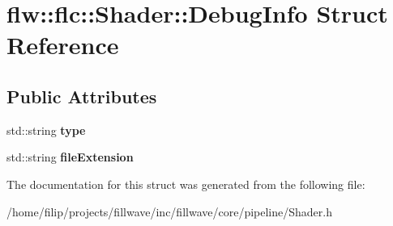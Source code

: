 \hypertarget{structflw_1_1flc_1_1Shader_1_1DebugInfo}{}\section{flw\+:\+:flc\+:\+:Shader\+:\+:Debug\+Info Struct Reference}
\label{structflw_1_1flc_1_1Shader_1_1DebugInfo}
\subsection*{Public Attributes}
\begin{DoxyCompactItemize}
\item 
\mbox{\label{structflw_1_1flc_1_1Shader_1_1DebugInfo_abac1271037f68e1b10d3db0fa8348da7}} 
std\+::string {\bfseries type}
\item 
\mbox{\label{structflw_1_1flc_1_1Shader_1_1DebugInfo_aca46dcb53fde094a6d039b9cae73c2d5}} 
std\+::string {\bfseries file\+Extension}
\end{DoxyCompactItemize}


The documentation for this struct was generated from the following file\+:\begin{DoxyCompactItemize}
\item 
/home/filip/projects/fillwave/inc/fillwave/core/pipeline/Shader.\+h\end{DoxyCompactItemize}
